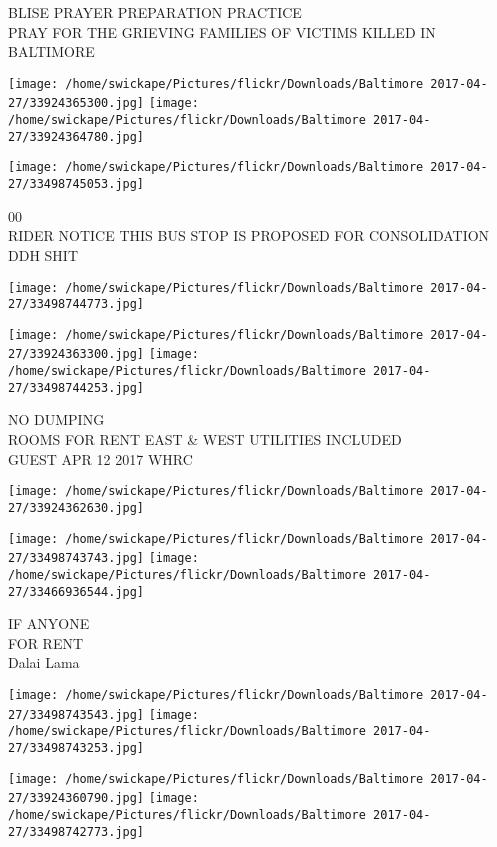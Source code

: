 \documentclass[10pt,letterpaper]{article}
\begin{document}
BLISE PRAYER PREPARATION PRACTICE\\
PRAY FOR THE GRIEVING FAMILIES OF VICTIMS KILLED IN BALTIMORE\\
\pagebreak

\texttt{[image: /home/swickape/Pictures/flickr/Downloads/Baltimore 2017-04-27/33924365300.jpg]}
\texttt{[image: /home/swickape/Pictures/flickr/Downloads/Baltimore 2017-04-27/33924364780.jpg]}

\texttt{[image: /home/swickape/Pictures/flickr/Downloads/Baltimore 2017-04-27/33498745053.jpg]}

00\\
RIDER NOTICE THIS BUS STOP IS PROPOSED FOR CONSOLIDATION\\
DDH SHIT\\
\pagebreak

\texttt{[image: /home/swickape/Pictures/flickr/Downloads/Baltimore 2017-04-27/33498744773.jpg]}

\vspace{0.25in}
\texttt{[image: /home/swickape/Pictures/flickr/Downloads/Baltimore 2017-04-27/33924363300.jpg]}
\texttt{[image: /home/swickape/Pictures/flickr/Downloads/Baltimore 2017-04-27/33498744253.jpg]}

NO DUMPING\\
ROOMS FOR RENT EAST \& WEST UTILITIES INCLUDED\\
GUEST APR 12 2017 WHRC\\
\pagebreak

\texttt{[image: /home/swickape/Pictures/flickr/Downloads/Baltimore 2017-04-27/33924362630.jpg]}

\vspace{0.25in}
\texttt{[image: /home/swickape/Pictures/flickr/Downloads/Baltimore 2017-04-27/33498743743.jpg]}
\texttt{[image: /home/swickape/Pictures/flickr/Downloads/Baltimore 2017-04-27/33466936544.jpg]}

IF ANYONE\\
FOR RENT\\
Dalai Lama\\
\pagebreak

\texttt{[image: /home/swickape/Pictures/flickr/Downloads/Baltimore 2017-04-27/33498743543.jpg]}
\texttt{[image: /home/swickape/Pictures/flickr/Downloads/Baltimore 2017-04-27/33498743253.jpg]}

\texttt{[image: /home/swickape/Pictures/flickr/Downloads/Baltimore 2017-04-27/33924360790.jpg]}
\texttt{[image: /home/swickape/Pictures/flickr/Downloads/Baltimore 2017-04-27/33498742773.jpg]}
\end{document}
